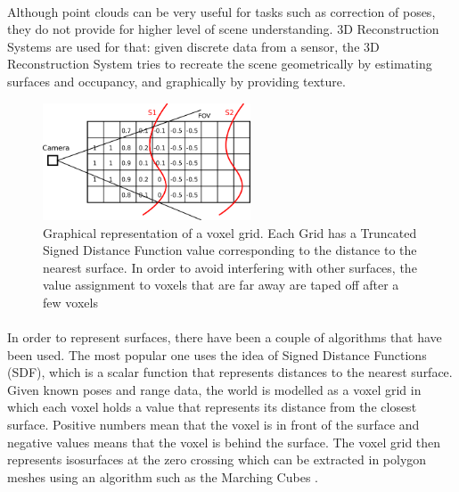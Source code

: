 \documentclass[12pt]{article}
\begin{document}
	\paragraph{}
	Although point clouds can be very useful for tasks such as correction of poses, they do not provide for higher level of scene understanding. 3D Reconstruction Systems are used for that: given discrete data from a sensor, the 3D Reconstruction System tries to recreate the scene geometrically by estimating surfaces and occupancy, and graphically by providing texture.
	
	\begin{figure}
		\centering
		\includegraphics[width=0.55\textwidth]{TSDF}
		\caption[t]{Graphical representation of a voxel grid. Each Grid has a Truncated Signed Distance Function value corresponding to the distance to the nearest surface. In order to avoid interfering with other surfaces, the value assignment to voxels that are far away are taped off after a few voxels}
		\label{fig:TSDF}
	\end{figure}
	
	\paragraph{}
	In order to represent surfaces, there have been a couple of algorithms that have been used. The most popular one uses the idea of Signed Distance Functions (SDF), which is a scalar function that represents distances to the nearest surface. Given known poses and range data, the world is modelled as a voxel grid in which each voxel holds  a value that represents its distance from the closest surface. Positive numbers mean that the voxel is in front of the surface and negative values means that the voxel is behind the surface. The voxel grid then represents isosurfaces at the zero crossing which can be extracted in polygon meshes using an algorithm such as the Marching Cubes \cite{marchingcubes}.
	
\end{document}

